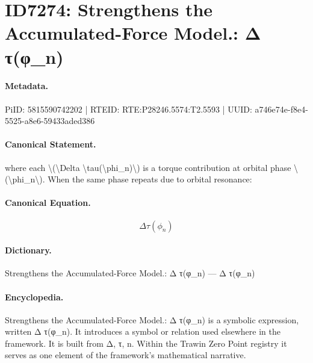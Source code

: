 \section*{ID7274: Strengthens the Accumulated-Force Model.: Δ τ(φ\_n)}
\paragraph{Metadata.}
PiID: 5815590742202 | RTEID: RTE:P28246.5574:T2.5593 | UUID: a746e74e-f8e4-5525-a8e6-59433aded386

\paragraph{Canonical Statement.}
where each \textbackslash{}(\textbackslash{}Delta \textbackslash{}tau(\textbackslash{}phi\_n)\textbackslash{}) is a torque contribution at orbital phase \textbackslash{}(\textbackslash{}phi\_n\textbackslash{}). When the same phase repeats due to orbital resonance:

\paragraph{Canonical Equation.}
\[
\Delta \tau(\phi_n)
\]

\paragraph{Dictionary.}
Strengthens the Accumulated-Force Model.: Δ τ(φ\_n) — Δ τ(φ\_n)

\paragraph{Encyclopedia.}
Strengthens the Accumulated-Force Model.: Δ τ(φ\_n) is a symbolic expression, written Δ τ(φ\_n). It introduces a symbol or relation used elsewhere in the framework. It is built from Δ, τ, n. Within the Trawin Zero Point registry it serves as one element of the framework's mathematical narrative.
